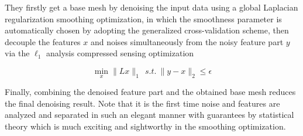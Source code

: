 They firstly get a base mesh by denoising the input data using a global Laplacian regularization smoothing optimization, in which the smoothness parameter is automatically chosen by adopting the generalized cross-validation scheme,
then decouple the features $x$ and noises simultaneously from the noisy feature part $y$ via the $\ell_1$ analysis compressed sensing optimization

\small{
\begin{equation}
 \label{eq:decoupling}
 \min_{x}\|Lx\|_1~~ s.t. ~ \|y-x\|_2 \le \epsilon
\end{equation}
}

Finally, combining the denoised feature part and the obtained base mesh reduces the final denoising result. Note that it is the first time noise and features are analyzed and separated in such an elegant manner with guarantees by statistical theory which is much exciting and sightworthy in the smoothing optimization. 